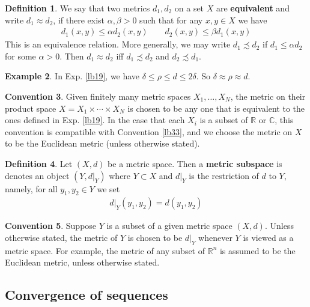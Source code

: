 \documentclass[12pt,b5paper,notitlepage]{article}
\theoremstyle{definition}
\newtheorem{df}{Definition}[section]
\newtheorem{eg}[df]{Example}
\newtheorem{cv}[df]{Convention}
\theoremstyle{plain}
\newcommand{\Cbb}{\mathbb C}
\newcommand{\Rbb}{\mathbb R}
\numberwithin{equation}{section}
\begin{document}
\begin{df}
We say that two metrics $d_1,d_2$ on a set $X$ are  \textbf{equivalent} and write $d_1\approx d_2$, if there exist $\alpha,\beta>0$ such that  for any $x,y\in X$ we have
\begin{gather*}
d_1(x,y)\leq\alpha d_2(x,y)\qquad d_2(x,y)\leq\beta d_1(x,y)
\end{gather*}  
This is an equivalence relation. More generally, we may write $d_1\precsim d_2$ if $d_1\leq \alpha d_2$ for some $\alpha>0$. Then $d_1\approx d_2$ iff $d_1\precsim d_2$ and $d_2\precsim d_1$.
\end{df}



\begin{eg}
In Exp. \ref{lb19}, we have $\delta\leq \rho\leq d\leq 2\delta$. So $\delta\approx\rho\approx d$.
\end{eg}

\begin{cv}\label{lb32}
Given finitely many metric spaces $X_1,\dots,X_N$, the metric on their product space $X=X_1\times\cdots\times X_N$ is chosen to be any one that is equivalent to the ones defined in Exp. \ref{lb19}. In the case that each $X_i$ is a subset of $\Rbb$ or $\Cbb$, this convention is compatible with Convention \ref{lb33}, and we choose the metric on $X$ to be the Euclidean metric (unless otherwise stated).
\end{cv}


\begin{df}\label{lb43}
Let $(X,d)$ be a metric space. Then a \textbf{metric subspace}  is denotes an object $(Y,d|_Y)$ where $Y\subset X$ and $d|_Y$ is the restriction of $d$ to $Y$, namely, for all $y_1,y_2\in Y$ we set
\begin{align*}
d|_Y(y_1,y_2)=d(y_1,y_2)
\end{align*}
\end{df}

\begin{cv}\label{lb76}
Suppose $Y$ is a subset of a given metric space $(X,d)$. Unless otherwise stated, the metric of $Y$ is chosen to be $d|_Y$ whenever $Y$ is viewed as a metric space. For example, the metric of any subset of $\Rbb^n$ is assumed to be the Euclidean metric, unless otherwise stated.
\end{cv}



\subsection{Convergence of sequences} \label{lb73}
\end{document}
